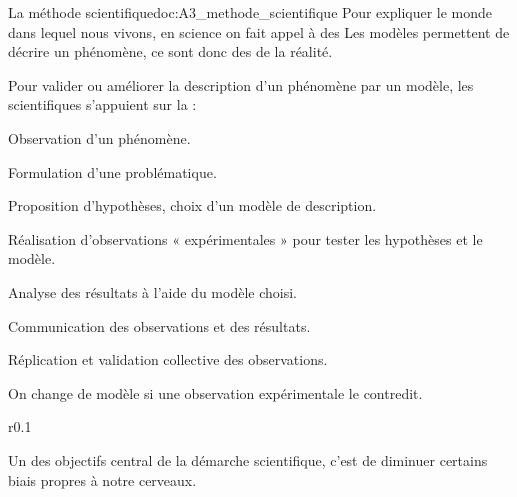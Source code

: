 \begin{doc}{La méthode scientifique}{doc:A3_methode_scientifique}
  Pour expliquer le monde dans lequel nous vivons, en science on fait appel à des  
  Les modèles permettent de décrire un phénomène, ce sont donc des  de la réalité.

  Pour valider ou améliorer la description d'un phénomène par un modèle, les scientifiques s'appuient sur la  :
  \begin{enumeration}
    \item Observation d'un phénomène.
    \item Formulation d'une problématique.
    \item Proposition d'hypothèses, choix d'un modèle de description.
    \item Réalisation d'observations « expérimentales » pour tester les hypothèses et le modèle.
    \item Analyse des résultats à l'aide du modèle choisi.
    \item Communication des observations et des résultats.
    \item Réplication et validation collective des observations.
  \end{enumeration}

  \flecheLongue On change de modèle si une observation expérimentale le contredit.
  \bigskip

  \begin{wrapfigure}[0]{r}{0.1\linewidth}
    \vspace*{-90pt}
  \end{wrapfigure}
  Un des objectifs central de la démarche scientifique, c'est de diminuer certains biais propres à notre cerveaux.
\end{doc}


